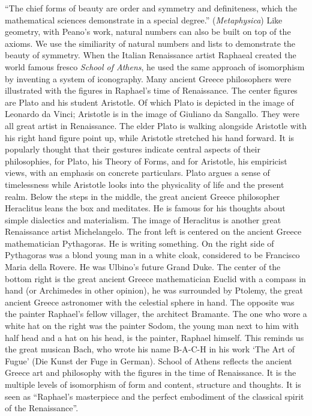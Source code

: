 \documentclass[UTF8]{article}
\begin{document}
``The chief forms of beauty are order and symmetry and definiteness, which the mathematical sciences demonstrate in a special degree.'' ({\em Metaphysica}) Like geometry, with Peano's work, natural numbers can also be built on top of the axioms. We use the similiarity of natural numbers and lists to demonstrate the beauty of symmetry. When the Italian Renaissance artist Raphaeal created the world famous fresco {\em School of Athens}, he used the same approach of isomorphism by inventing a system of iconography. Many ancient Greece philosophers were illustrated with the figures in Raphael's time of Renaissance. The center figures are Plato and his student Aristotle. Of which Plato is depicted in the image of Leonardo da Vinci; Aristotle is in the image of Giuliano da Sangallo. They were all great artist in Renaissance. The elder Plato is walking alongside Aristotle with his right hand figure point up, while Aristotle stretched his hand forward. It is popularly thought that their gestures indicate central aspects of their philosophies, for Plato, his Theory of Forms, and for Aristotle, his empiricist views, with an emphasis on concrete particulars. Plato argues a sense of timelessness while Aristotle looks into the physicality of life and the present realm. Below the steps in the middle, the great ancient Greece philosopher Heraclitus leans the box and meditates. He is famous for his thoughts about simple dialectics and materialism. The image of Heraclitus is another great Renaissance artist Michelangelo. The front left is centered on the ancient Greece mathematician Pythagoras. He is writing something. On the right side of Pythagoras was a blond young man in a white cloak, considered to be Francisco Maria della Rovere. He was Ulbino's future Grand Duke. The center of the bottom right is the great ancient Greece mathematician Euclid with a compass in hand (or Archimedes in other opinion), he was surrounded by Ptolemy, the great ancient Greece astronomer with the celestial sphere in hand. The opposite was the painter Raphael's fellow villager, the architect Bramante. The one who wore a white hat on the right was the painter Sodom, the young man next to him with half head and a hat on his head, is the painter, Raphael himself. This reminds us the great musican Bach, who wrote his name B-A-C-H in his work `The Art of Fugue' (Die Kunst der Fuge in German). School of Athens reflects the ancient Greece art and philosophy with the figures in the time of Renaissance. It is the multiple levels of isomorphism of form and content, structure and thoughts. It is seen as ``Raphael's masterpiece and the perfect embodiment of the classical spirit of the Renaissance''.
\end{document}
